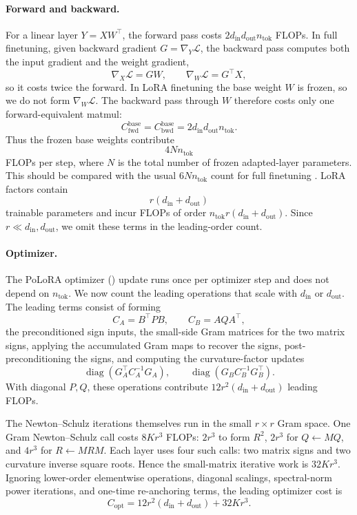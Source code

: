 \documentclass[11pt]{article}
\DeclareMathOperator{\diag}{diag}
\newcommand{\methodname}{PoLoRA\xspace}
\theoremstyle{plain}
\theoremstyle{definition}
\theoremstyle{remark}
\theoremstyle{definition}
\begin{document}
\paragraph{Forward and backward.}
For a linear
layer $Y=XW^\top$, the forward pass costs
$2d_{\mathrm{in}}d_{\mathrm{out}}n_{\mathrm{tok}}$
FLOPs.
In full finetuning, given backward gradient $G=\nabla_Y \mathcal{L}$,
the backward pass computes both the input gradient and
the weight gradient, 
\[
\nabla_X \mathcal{L} = GW,
\qquad
\nabla_W \mathcal{L} = G^\top X,
\]
so it costs twice the forward.  In LoRA finetuning the
base weight $W$ is frozen, so we do not form
$\nabla_W \mathcal{L}$.  The
backward pass through $W$ therefore costs only one forward-equivalent
matmul:
\begin{equation}
  C_{\mathrm{fwd}}^{\mathrm{base}}
  =
  C_{\mathrm{bwd}}^{\mathrm{base}}
  =
  2 d_{\mathrm{in}}d_{\mathrm{out}} n_{\mathrm{tok}} .
  \label{eq:flop-fb}
\end{equation}
Thus the frozen base weights contribute
\[
    4N n_{\mathrm{tok}}
\]
FLOPs per step, where $N$ is the total number of frozen adapted-layer
parameters.  This should be compared with the usual
$6N n_{\mathrm{tok}}$ count for full finetuning
\cite{kaplan2020scaling}.
LoRA factors  contain
\[
    r(d_{\mathrm{in}}+d_{\mathrm{out}})
\]
trainable parameters and incur FLOPs of order
$n_{\mathrm{tok}}r(d_{\mathrm{in}}+d_{\mathrm{out}})$.  Since
$r\ll d_{\mathrm{in}},d_{\mathrm{out}}$, we omit these terms in the
leading-order count.


\paragraph{Optimizer.}
The \methodname{} optimizer () update runs once per optimizer step and does not
depend on $n_{\mathrm{tok}}$.  
We now count the leading operations that scale with
$d_{\mathrm{in}}$ or $d_{\mathrm{out}}$. 
The leading terms consist of forming
\[
    C_A=B^\top P B,
    \qquad
    C_B=A Q A^\top,
\]
the preconditioned sign inputs, 
the small-side Gram matrices for the two
matrix signs, applying the accumulated Gram maps to recover the signs,
post-preconditioning the signs, and computing the curvature-factor updates
\[
    \diag(G_A^\top C_A^{-1}G_A),
    \qquad
    \diag(G_B C_B^{-1}G_B^\top).
\]
With diagonal $P, Q$, these operations contribute
$12r^2(d_{\mathrm{in}}+d_{\mathrm{out}})$
leading FLOPs.

The Newton--Schulz iterations themselves run in the small $r\times r$ Gram
space.  One Gram Newton--Schulz call costs $8Kr^3$ FLOPs:
$2r^3$ to form $R^2$, $2r^3$ for $Q\leftarrow MQ$, and $4r^3$ for
$R\leftarrow MRM$.  Each layer uses four such calls: two matrix signs and two
curvature inverse square roots.  Hence the small-matrix iterative work is $32Kr^3$.
Ignoring lower-order elementwise operations, diagonal scalings, spectral-norm
power iterations, and one-time re-anchoring terms, the leading optimizer cost is
\begin{equation}
  C_{\mathrm{opt}}
  =
  12r^2(d_{\mathrm{in}}+d_{\mathrm{out}})
  +
  32Kr^3 .
  \label{eq:flop-opt}
\end{equation}
\end{document}
